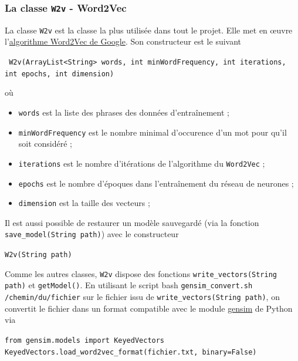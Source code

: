 \documentclass[10pt,a4paper]{article}
\newcommand\tab[1][0.5cm]{\hspace*{#1}}
\begin{document}
\subsubsection{La classe \texttt{W2v} - Word2Vec}
La classe \texttt{W2v} est la classe la plus utilisée dans tout le projet. Elle met en œuvre l'\href{https://patents.google.com/patent/US9037464B1/en}{algorithme Word2Vec de Google}. Son constructeur est le suivant
\begin{center}
\texttt{ W2v(ArrayList<String> words, int minWordFrequency, int iterations, int epochs, int dimension)}
\end{center}
où
\begin{itemize}
\item \texttt{words} est la liste des phrases des données d'entraînement ;
\item \texttt{minWordFrequency} est le nombre minimal d'occurence d'un mot pour qu'il soit considéré ;
\item \texttt{iterations} est le nombre d'itérations de l'algorithme du \texttt{Word2Vec} ;
\item \texttt{epochs} est le nombre d'époques dans l'entraînement du réseau de neurones ;
\item \texttt{dimension} est la taille des vecteurs ;
\end{itemize}
Il est aussi possible de restaurer un modèle sauvegardé (via la fonction \texttt{save\_model(String path)}) avec le constructeur
\begin{center}
\texttt{W2v(String path)}
\end{center}
\tab Comme les autres classes, \texttt{W2v} dispose des fonctions \texttt{write\_vectors(String path)} et \texttt{getModel()}. En utilisant le script bash \texttt{gensim\_convert.sh /chemin/du/fichier} sur le fichier issu de \texttt{write\_vectors(String path)}, on convertit le fichier dans un format compatible avec le module \href{https://pypi.org/project/gensim/}{gensim} de Python via
\begin{center}
 \texttt{from gensim.models import KeyedVectors} \\
\texttt{KeyedVectors.load\_word2vec\_format(fichier.txt, binary=False)}
\end{center}
\end{document}
